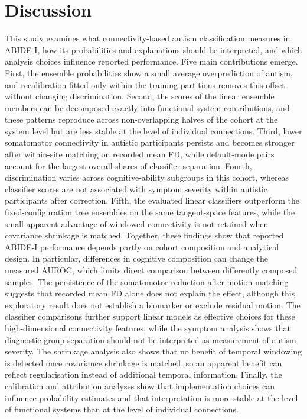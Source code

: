 \section{Discussion}
\label{sec:discussion}

This study examines what connectivity-based autism classification measures in ABIDE-I, how its probabilities and explanations should be interpreted, and which analysis choices influence reported performance. Five main contributions emerge. First, the ensemble probabilities show a small average overprediction of autism, and recalibration fitted only within the training partitions removes this offset without changing discrimination. Second, the scores of the linear ensemble members can be decomposed exactly into functional-system contributions, and these patterns reproduce across non-overlapping halves of the cohort at the system level but are less stable at the level of individual connections. Third, lower somatomotor connectivity in autistic participants persists and becomes stronger after within-site matching on recorded mean FD, while default-mode pairs account for the largest overall shares of classifier separation. Fourth, discrimination varies across cognitive-ability subgroups in this cohort, whereas classifier scores are not associated with symptom severity within autistic participants after correction. Fifth, the evaluated linear classifiers outperform the fixed-configuration tree ensembles on the same tangent-space features, while the small apparent advantage of windowed connectivity is not retained when covariance shrinkage is matched. Together, these findings show that reported ABIDE-I performance depends partly on cohort composition and analytical design. In particular, differences in cognitive composition can change the measured AUROC, which limits direct comparison between differently composed samples. The persistence of the somatomotor reduction after motion matching suggests that recorded mean FD alone does not explain the effect, although this exploratory result does not establish a biomarker or exclude residual motion. The classifier comparisons further support linear models as effective choices for these high-dimensional connectivity features, while the symptom analysis shows that diagnostic-group separation should not be interpreted as measurement of autism severity. The shrinkage analysis also shows that no benefit of temporal windowing is detected once covariance shrinkage is matched, so an apparent benefit can reflect regularisation instead of additional temporal information. Finally, the calibration and attribution analyses show that implementation choices can influence probability estimates and that interpretation is more stable at the level of functional systems than at the level of individual connections.

